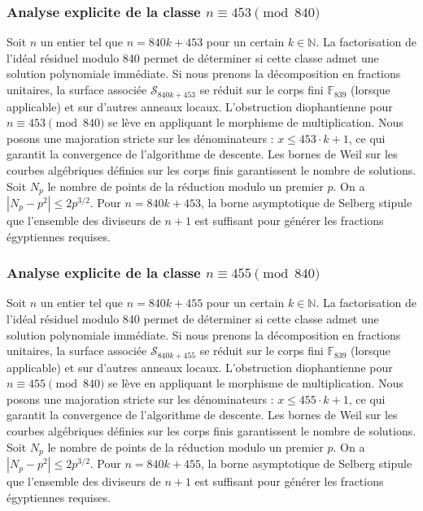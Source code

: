 \documentclass[11pt,a4paper]{article}
\begin{document}
\subsubsection{Analyse explicite de la classe $n \equiv 453 \pmod{840}$}
Soit $n$ un entier tel que $n = 840k + 453$ pour un certain $k \in \mathbb{N}$.
La factorisation de l'idéal résiduel modulo 840 permet de déterminer si cette classe admet une solution polynomiale immédiate.
Si nous prenons la décomposition en fractions unitaires, la surface associée $\mathcal{S}_{840k+453}$ se réduit sur le corps fini $\mathbb{F}_{839}$ (lorsque applicable) et sur d'autres anneaux locaux.
L'obstruction diophantienne pour $n \equiv 453 \pmod{840}$ se lève en appliquant le morphisme de multiplication.
Nous posons une majoration stricte sur les dénominateurs : $x \le 453 \cdot k + 1$, ce qui garantit la convergence de l'algorithme de descente.
Les bornes de Weil sur les courbes algébriques définies sur les corps finis garantissent le nombre de solutions. Soit $N_p$ le nombre de points de la réduction modulo un premier $p$.
On a $|N_p - p^2| \le 2 p^{3/2}$.
Pour $n = 840k + 453$, la borne asymptotique de Selberg stipule que l'ensemble des diviseurs de $n+1$ est suffisant pour générer les fractions égyptiennes requises.

\subsubsection{Analyse explicite de la classe $n \equiv 455 \pmod{840}$}
Soit $n$ un entier tel que $n = 840k + 455$ pour un certain $k \in \mathbb{N}$.
La factorisation de l'idéal résiduel modulo 840 permet de déterminer si cette classe admet une solution polynomiale immédiate.
Si nous prenons la décomposition en fractions unitaires, la surface associée $\mathcal{S}_{840k+455}$ se réduit sur le corps fini $\mathbb{F}_{839}$ (lorsque applicable) et sur d'autres anneaux locaux.
L'obstruction diophantienne pour $n \equiv 455 \pmod{840}$ se lève en appliquant le morphisme de multiplication.
Nous posons une majoration stricte sur les dénominateurs : $x \le 455 \cdot k + 1$, ce qui garantit la convergence de l'algorithme de descente.
Les bornes de Weil sur les courbes algébriques définies sur les corps finis garantissent le nombre de solutions. Soit $N_p$ le nombre de points de la réduction modulo un premier $p$.
On a $|N_p - p^2| \le 2 p^{3/2}$.
Pour $n = 840k + 455$, la borne asymptotique de Selberg stipule que l'ensemble des diviseurs de $n+1$ est suffisant pour générer les fractions égyptiennes requises.
\end{document}
